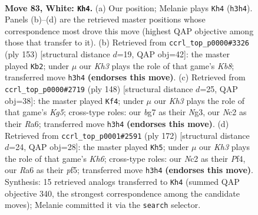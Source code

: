 \documentclass[11pt]{article}
\begin{document}
\clearpage

\begin{figure}[p]\centering
\begin{subfigure}{0.46\textwidth}\centering
\resizebox{\linewidth}{!}{%
\newchessgame
\chessboard[
  setfen={6k1/5rb1/R1P5/6R1/8/7K/2N5/8 w - - 5 83},
  showmover=false,
  pgfstyle=straightmove, color=movearrow, markmove={h3-h4}
]}
\caption{}
\end{subfigure}\hfill
\begin{subfigure}{0.46\textwidth}\centering
\resizebox{\linewidth}{!}{%
\newchessgame
\chessboard[
  setfen={8/8/8/8/2p1KB1r/6R1/8/1k6 b - - 9 77},
  showmover=false,
  pgfstyle=straightmove, color=movearrow, markmove={b1-b2}
]}
\caption{}
\end{subfigure}
\\[4pt]
\begin{subfigure}{0.46\textwidth}\centering
\resizebox{\linewidth}{!}{%
\newchessgame
\chessboard[
  setfen={5k2/5b2/R7/6K1/7P/6N1/8/6r1 w - - 35 75},
  showmover=false,
  pgfstyle=straightmove, color=movearrow, markmove={g5-f4}
]}
\caption{}
\end{subfigure}\hfill
\begin{subfigure}{0.46\textwidth}\centering
\resizebox{\linewidth}{!}{%
\newchessgame
\chessboard[
  setfen={8/1R2bk2/7K/5p2/5P2/8/8/8 w - - 66 87},
  showmover=false,
  pgfstyle=straightmove, color=movearrow, markmove={h6-h5}
]}
\caption{}
\end{subfigure}
\caption{\textbf{Move 83, White: \texttt{Kh4}.} (a) Our position; Melanie plays \texttt{Kh4} (\texttt{h3h4}). Panels (b)--(d) are the retrieved master positions whose correspondence most drove this move (highest QAP objective among those that transfer to it). (b) Retrieved from \texttt{ccrl\_top\_p0000\#3326} (ply 153) [structural distance $d$=19, QAP obj=42]: the master played \texttt{Kb2}; under $\mu$ our \emph{Kh3} plays the role of that game's \emph{Kb8}; transferred move \texttt{h3h4} \textbf{(endorses this move)}. (c) Retrieved from \texttt{ccrl\_top\_p0000\#2719} (ply 148) [structural distance $d$=25, QAP obj=38]: the master played \texttt{Kf4}; under $\mu$ our \emph{Kh3} plays the role of that game's \emph{Kg5}; cross-type roles: our \emph{b}g7 as their \emph{N}g3, our \emph{N}c2 as their \emph{R}a6; transferred move \texttt{h3h4} \textbf{(endorses this move)}. (d) Retrieved from \texttt{ccrl\_top\_p0001\#2591} (ply 172) [structural distance $d$=24, QAP obj=28]: the master played \texttt{Kh5}; under $\mu$ our \emph{Kh3} plays the role of that game's \emph{Kh6}; cross-type roles: our \emph{N}c2 as their \emph{P}f4, our \emph{R}a6 as their \emph{p}f5; transferred move \texttt{h3h4} \textbf{(endorses this move)}. Synthesis: 15 retrieved analogs transferred to \texttt{Kh4} (summed QAP objective 340, the strongest correspondence among the candidate moves); Melanie committed it via the \texttt{search} selector.}
\label{fig:thought-m164}
\end{figure}
\end{document}

